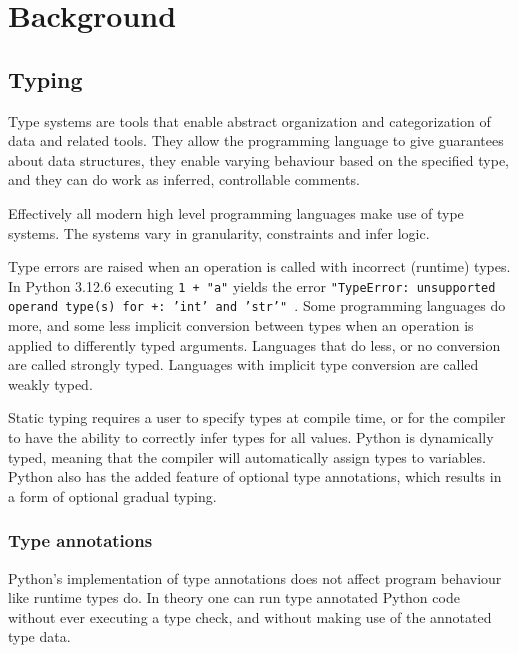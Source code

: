 \chapter{Background\label{background}}


\section{Typing}

Type systems are tools that enable abstract organization and categorization of data and related tools\cite{programming_langs}. They allow the programming language to give guarantees about data structures, they enable varying behaviour based on the specified type, and they can do work as inferred, controllable comments.

Effectively all modern high level programming languages make use of type systems. The systems vary in granularity, constraints and infer logic. %

Type errors are raised when an operation is called with incorrect (runtime) types. In Python 3.12.6 executing {\tt 1 + "a"} yields the error {\tt "TypeError: unsupported operand type(s) for +: 'int' and 'str'" }. Some programming languages do more, and some less implicit conversion between types when an operation is applied to differently typed arguments. Languages that do less, or no conversion are called strongly typed. Languages with implicit type conversion are called weakly typed. %

Static typing requires a user to specify types at compile time, or for the compiler to have the ability to correctly infer types for all values. Python is dynamically typed, meaning that the compiler will automatically assign types to variables. Python also has the added feature of optional type annotations, which results in a form of optional gradual typing.

\subsection{Type annotations}
Python's implementation of type annotations does not affect program behaviour like runtime types do. In theory one can run type annotated Python code without ever executing a type check, and without making use of the annotated type data.

